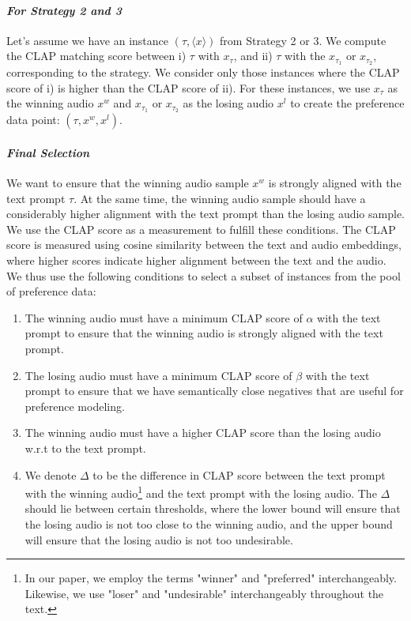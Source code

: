 \paragraph{\bf \textit{For Strategy 2 and 3}} Let's assume we have an instance $(\tau, \langle x \rangle)$ from Strategy 2 or 3. We compute the CLAP matching score between i) $\tau$ with $x_{\tau}$, and ii) $\tau$ with the $x_{\tau_1}$ or $x_{\tau_2}$, corresponding to the strategy. We consider only those instances where the CLAP score of i) is higher than the CLAP score of ii). For these instances, we use $x_{\tau}$ as the winning audio $x^w$ and $x_{\tau_1}$ or $x_{\tau_2}$ as the losing audio $x^l$ to create the preference data point: $(\tau, x^w, x^l)$.

\paragraph{\bf \textit{Final Selection}} We want to ensure that the winning audio sample $x^w$ is strongly aligned with the text prompt 
$\tau$. At the same time, the winning audio sample should have a considerably higher alignment with the text prompt than the losing audio sample. We use the CLAP score as a measurement to fulfill these conditions. The CLAP score is measured using cosine similarity between the text and audio embeddings, where higher scores indicate higher alignment between the text and the audio. We thus use the following conditions to select a subset of instances from the pool of preference data:

\begin{enumerate}[leftmargin=0.5cm]
    \item The winning audio must have a minimum CLAP score of $\alpha$ with the text prompt to ensure that the winning audio is strongly aligned with the text prompt.
    \item The losing audio must have a minimum CLAP score of $\beta$ with the text prompt to ensure that we have semantically close negatives that are useful for preference modeling.
    \item The winning audio must have a higher CLAP score than the losing audio w.r.t to the text prompt.
    \item We denote $\Delta$ to be the difference in CLAP score between the text prompt with the winning audio\footnote{In our paper, we employ the terms "winner" and "preferred" interchangeably. Likewise, we use "loser" and "undesirable" interchangeably throughout the text.} and the text prompt with the losing audio. The $\Delta$ should lie between certain thresholds, where the lower bound will ensure that the losing audio is not too close to the winning audio, and the upper bound will ensure that the losing audio is not too undesirable.
\end{enumerate}

